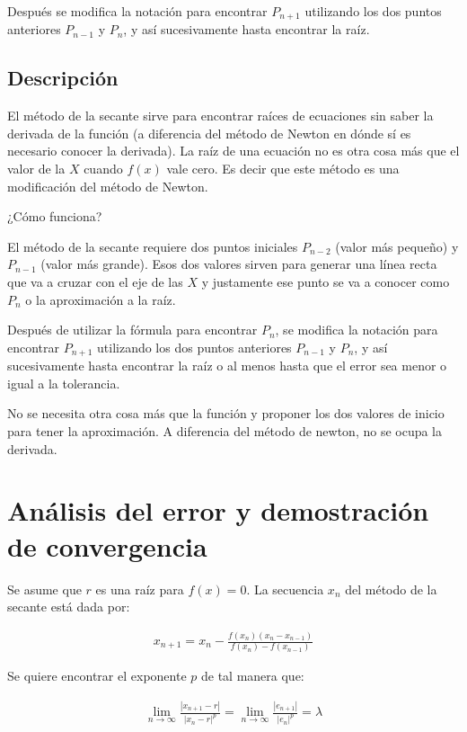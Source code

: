 \documentclass[10pt,technote]{IEEEtran}
\begin{document}
Después se modifica la notación para encontrar $P_{n+1}$ utilizando los dos puntos anteriores $P_{n-1}$ y $P_n$, y así sucesivamente hasta encontrar la raíz.

\subsection{Descripción}
El método de la secante sirve para encontrar raíces de ecuaciones sin saber la derivada de la función (a diferencia del método de Newton en dónde sí es necesario conocer la derivada). La raíz de una ecuación no es otra cosa más que el valor de la $X$ cuando $f(x)$ vale cero. Es decir que este método es una modificación del método de Newton.

¿Cómo funciona?

El método de la secante requiere dos puntos iniciales $P_{n-2}$ (valor más pequeño) y $P_{n-1}$ (valor más grande). Esos dos valores sirven para generar una línea recta que va a cruzar con el eje de las $X$ y justamente ese punto se va a conocer como $P_n$ o la aproximación a la raíz.

Después de utilizar la fórmula para encontrar $P_n$, se modifica la notación para encontrar $P_{n+1}$ utilizando los dos puntos anteriores $P_{n-1}$ y $P_n$, y así sucesivamente hasta encontrar la raíz o al menos hasta que el error sea menor o igual a la tolerancia. 

No se necesita otra cosa más que la función y proponer los dos valores de inicio para tener la aproximación. A diferencia del método de newton, no se ocupa la derivada.


\section{Análisis del error y demostración de convergencia}

Se asume que $r$ es una raíz para $f(x)=0$. La secuencia ${x_n}$ del método de la secante está dada por: 

\begin{gather*}
x_{n+1 }= x_{n} - \frac{f(x_{n})(x_{n}-x_{n-1})}{f(x_{n})-f(x_{n-1})} 
\end{gather*}

Se quiere encontrar el exponente $p$ de tal manera que:

\begin{gather*}
\lim_{n\to \infty} \frac{|x_{n+1}-r|}{|x_n - r|^{p}} = \lim_{n\to \infty} \frac{|e_{n+1}|}{|e_n|^{p}} = \lambda
\end{gather*}
\end{document}
